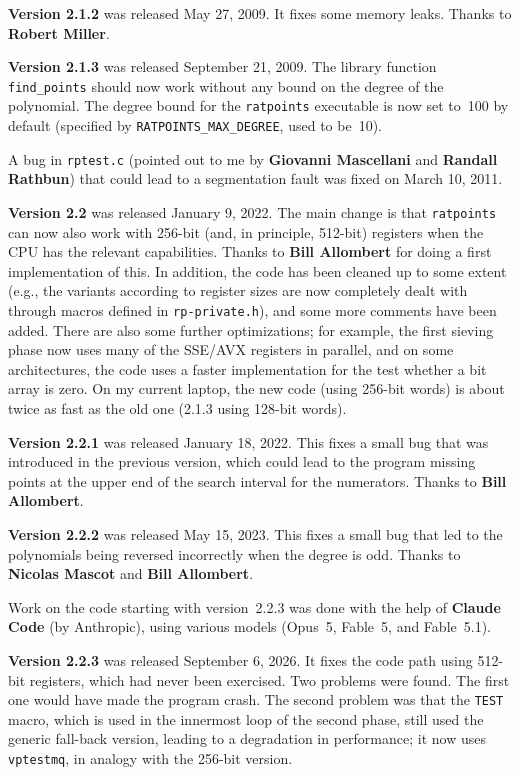 \documentclass[12pt,a4paper,oneside]{amsart}
\begin{document}
\textbf{Version 2.1.2} was released May 27, 2009. It fixes some memory leaks.
Thanks to \textbf{Robert Miller}.

\textbf{Version 2.1.3} was released September 21, 2009. The library function
\verb+find_points+ should now work without any bound on the degree of the
polynomial. The degree bound for the \texttt{ratpoints} executable is now set
to~100 by default (specified by \verb+RATPOINTS_MAX_DEGREE+, used to be~10).

A bug in \texttt{rptest.c} (pointed out to me by \textbf{Giovanni Mascellani}
and \textbf{Randall Rathbun}) that could lead to a segmentation fault was fixed on
March 10, 2011.

\textbf{Version 2.2} was released January 9, 2022. The main change is that
\texttt{ratpoints} can now also work with 256-bit (and, in principle, 512-bit)
registers when the CPU has the relevant capabilities. Thanks to
\textbf{Bill Allombert} for doing a first implementation of this. In addition,
the code has been cleaned up to some extent (e.g., the variants according
to register sizes are now completely dealt with through macros defined
in \texttt{rp-private.h}), and some more comments have been added.
There are also some further optimizations; for example, the first sieving
phase now uses many of the SSE/AVX registers in parallel, and on some
architectures, the code uses a faster implementation for the test whether
a bit array is zero. On my current laptop, the new code (using 256-bit words)
is about twice as fast as the old one (2.1.3 using 128-bit words).

\textbf{Version 2.2.1} was released January 18, 2022. This fixes a small
bug that was introduced in the previous version, which could lead to
the program missing points at the upper end of the search interval
for the numerators. Thanks to \textbf{Bill Allombert}.

\textbf{Version 2.2.2} was released May 15, 2023. This fixes a small
bug that led to the polynomials being reversed incorrectly when the
degree is odd. Thanks to \textbf{Nicolas Mascot} and \textbf{Bill Allombert}.

Work on the code starting with version~2.2.3 was done with the help
of \textbf{Claude Code} (by Anthropic), using various models
(Opus~5, Fable~5, and Fable~5.1).

\textbf{Version 2.2.3} was released September 6, 2026. It fixes the code
path using 512-bit registers, which had never been exercised. Two problems
were found. The first one would have made
the program crash. The second problem was that the \texttt{TEST} macro, which is
used in the innermost loop of the second phase, still used the generic
fall-back version, leading to a degradation in performance;
it now uses \texttt{vptestmq}, in analogy with the 256-bit version.
\end{document}
